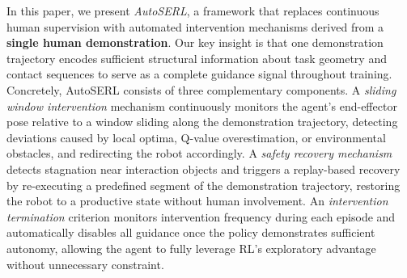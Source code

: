 \documentclass[runningheads]{llncs}
\begin{document}
In this paper, we present \textit{AutoSERL}, a framework that replaces continuous human supervision with automated intervention mechanisms derived from a \textbf{single human demonstration}. Our key insight is that one demonstration trajectory encodes sufficient structural information about task geometry and contact sequences to serve as a complete guidance signal throughout training. Concretely, AutoSERL consists of three complementary components. A \textit{sliding window intervention} mechanism continuously monitors the 
agent's end-effector pose relative to a window sliding along the demonstration trajectory, detecting deviations caused by local optima, Q-value overestimation, or environmental obstacles, and redirecting the robot accordingly. A \textit{safety recovery mechanism} detects stagnation near interaction objects and triggers a replay-based recovery by re-executing a predefined segment of the demonstration trajectory, restoring the robot to a productive state without human involvement. An \textit{intervention termination} criterion monitors intervention frequency during each episode and automatically disables all guidance once the policy demonstrates sufficient autonomy, allowing the agent to fully leverage RL's exploratory advantage without unnecessary constraint.
\end{document}
